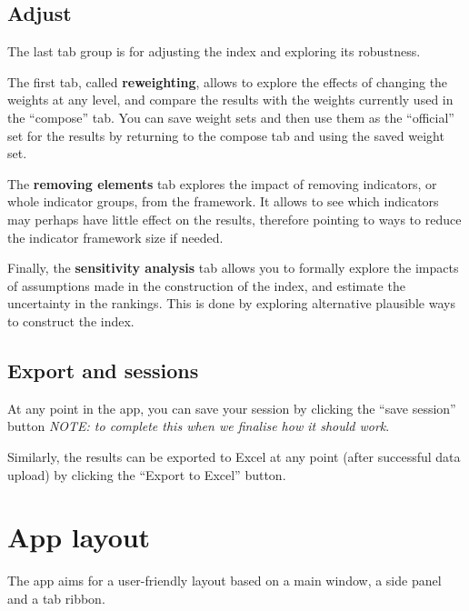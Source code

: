 \documentclass[
  letterpaper,
  DIV=11,
  numbers=noendperiod]{scrreprt}
\begin{document}
\hypertarget{adjust}{%
\section{Adjust}\label{adjust}}

The last tab group is for adjusting the index and exploring its
robustness.

The first tab, called \textbf{reweighting}, allows to explore the
effects of changing the weights at any level, and compare the results
with the weights currently used in the ``compose'' tab. You can save
weight sets and then use them as the ``official'' set for the results by
returning to the compose tab and using the saved weight set.

The \textbf{removing elements} tab explores the impact of removing
indicators, or whole indicator groups, from the framework. It allows to
see which indicators may perhaps have little effect on the results,
therefore pointing to ways to reduce the indicator framework size if
needed.

Finally, the \textbf{sensitivity analysis} tab allows you to formally
explore the impacts of assumptions made in the construction of the
index, and estimate the uncertainty in the rankings. This is done by
exploring alternative plausible ways to construct the index.

\hypertarget{export-and-sessions}{%
\section{Export and sessions}\label{export-and-sessions}}

At any point in the app, you can save your session by clicking the
``save session'' button \emph{NOTE: to complete this when we finalise
how it should work}.

Similarly, the results can be exported to Excel at any point (after
successful data upload) by clicking the ``Export to Excel'' button.


\hypertarget{sec-app_layout}{%
\chapter{App layout}\label{sec-app_layout}}

The app aims for a user-friendly layout based on a main window, a side
panel and a tab ribbon.
\end{document}
